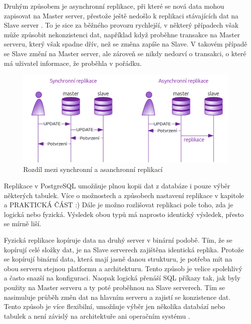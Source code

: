 Druhým způsobem je asynchronní replikace, při které se nová data mohou zapisovat na Master server, přestože ještě nedošlo k replikaci stávajících dat na Slave server \citep{ObeHsu2012}. To je sice za běžného provozu rychlejší, v některý případech však může způsobit nekonzistenci dat, například když proběhne transakce na Master serveru, který však spadne dřív, než se změna zapíše na Slave. V takovém případě se Slave změní na Master server, ale zároveň se nikdy nedozví o transakci, o které má uživatel informace, že proběhla v pořádku. 

        \begin{figure}[H]
          \centering
          \includegraphics[scale=1]{../../../grafy/obr/schema_asyncSync_maxiTence.png}
          \caption {Rozdíl mezi synchronní a asanchronní replikací}
        \end{figure}

Replikace v PostgreSQL umožňuje plnou kopii dat z databáze i pouze výběr některých tabulek. Více o možnostech a způsobech nastavení replikace v kapitole \odkazKapitola{} a PRAKTICKÁ ČÁST :)
Dále je možno rozlišovat replikaci pole toho, zda je logická nebo fyzická. Výsledek obou typů má naprosto identický výsledek, přesto se mírně liší. 

Fyzická replikace kopíruje data na druhý server v binární podobě. Tím, že se kopírují celé složky dat, je na Slave serverech zajištěna identická replika. Protože se kopírují binární data, která mají jasně danou strukturu, je potřeba mít na obou serveru stejnou platformu a architekturu. Tento způsob je velice spolehlivý a často snazší na konfiguraci. Naopak logická přenáší SQL příkazy tak, jak byly použity na Master serveru a ty poté proběhnou na Slave serverech. Tím se nasimuluje průběh změn dat na hlavním serveru a zajistí se konzistence dat. Tento způsob je více flexibilní, umožňuje výběr jen několika databází nebo tabulek a není závislý na architektuře ani operačním systému \citep{Boszormenyi2013}. 

